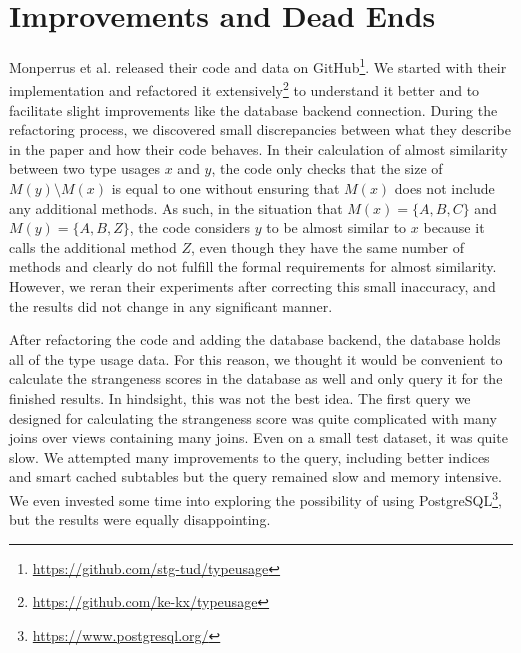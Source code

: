 \section{Improvements and Dead Ends}\label{sec:deadends}


Monperrus et al. released their code and data on GitHub\footnote{\url{https://github.com/stg-tud/typeusage}}.
We started with their implementation and refactored it extensively\footnote{\url{https://github.com/ke-kx/typeusage}} to understand it better and to facilitate slight improvements like the database backend connection.
During the refactoring process, we discovered small discrepancies between what they describe in the paper and how their code behaves.
In their calculation of almost similarity between two type usages $x$ and $y$, the code only checks that the size of $M(y) \setminus M(x)$ is equal to one without ensuring that $M(x)$ does not include any additional methods.
As such, in the situation that $M(x) =\{A, B, C\}$ and $M(y) = \{A, B, Z\}$, the code considers $y$ to be almost similar to $x$ because it calls the additional method $Z$, even though they have the same number of methods and clearly do not fulfill the formal requirements for almost similarity.
However, we reran their experiments after correcting this small inaccuracy, and the results did not change in any significant manner.

After refactoring the code and adding the database backend, the database holds all of the type usage data.
For this reason, we thought it would be convenient to calculate the strangeness scores in the database as well and only query it for the finished results.
In hindsight, this was not the best idea.
The first query we designed for calculating the strangeness score was quite complicated with many joins over views containing many joins.
Even on a small test dataset, it was quite slow.
We attempted many improvements to the query, including better indices and smart cached subtables but the query remained slow and memory intensive.
We even invested some time into exploring the possibility of using PostgreSQL\footnote{\url{https://www.postgresql.org/}}, but the results were equally disappointing.

